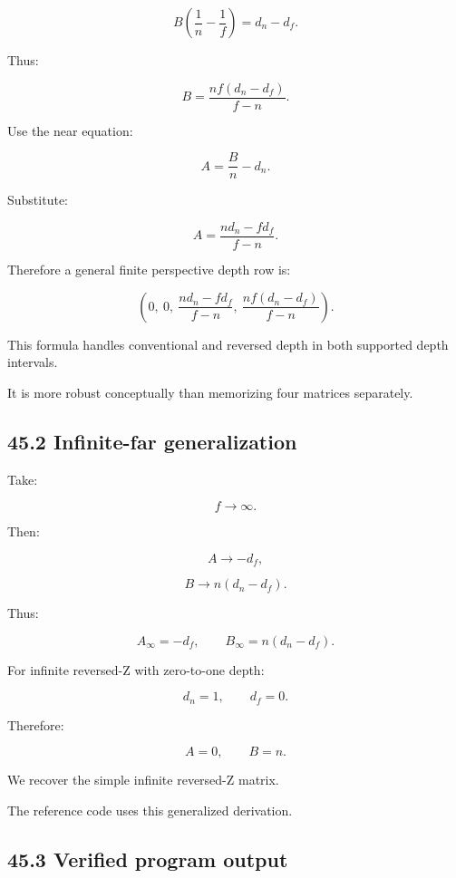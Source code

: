 \[
 B\left(\frac1n-\frac1f\right)=d_n-d_f.
\]

Thus:

\[
 \boxed{ B=\frac{nf(d_n-d_f)}{f-n} }.
\]

Use the near equation:

\[
 A=\frac Bn-d_n.
\]

Substitute:

\[
 \boxed{ A=\frac{nd_n-fd_f}{f-n} }.
\]

Therefore a general finite perspective depth row is:

\[
 \boxed{ \left( 0,\ 0,\ \frac{nd_n-fd_f}{f-n},\ \frac{nf(d_n-d_f)}{f-n} \right) }.
\]

This formula handles conventional and reversed depth in both supported depth intervals.

It is more robust conceptually than memorizing four matrices separately.

\subsection{45.2 Infinite-far generalization}\label{02-foundations-ii-ch037-infinite-far-generalization}

\hypertarget{02-foundations-ii-ch037-infinite-far-generalization}{}

Take:

\[
 f\to\infty.
\]

Then:

\[
 A\to-d_f,
\]

\[
 B\to n(d_n-d_f).
\]

Thus:

\[
 \boxed{ A_{\infty}=-d_f, \qquad B_{\infty}=n(d_n-d_f) }.
\]

For infinite reversed-Z with zero-to-one depth:

\[
 d_n=1,\qquad d_f=0.
\]

Therefore:

\[
 A=0,\qquad B=n.
\]

We recover the simple infinite reversed-Z matrix.

The reference code uses this generalized derivation.

\subsection{45.3 Verified program output}\label{02-foundations-ii-ch037-verified-program-output}

\hypertarget{02-foundations-ii-ch037-verified-program-output}{}

